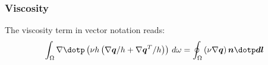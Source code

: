 \subsubsection{Viscosity}
The viscosity term in vector notation reads:
\begin{align}
    \int_\Omega \nabla \dotp \left( \nu h \left(  \nabla \vec{q}/h + \nabla \vec{q}^T/h \right) \right)\, d\omega =
    \oint_{\Omega}  \left(\nu \nabla \vec{q} \right) \vec{n} \dotp \vec{dl}
\end{align}
%

